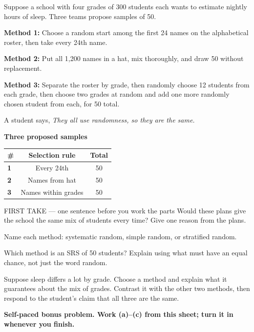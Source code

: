 \documentclass[14pt]{extarticle}
\begin{document}
\pagestyle{empty}


\noindent\begin{minipage}[t]{0.57\linewidth}
\vspace{0pt}
Suppose a school with four grades of 300 students each wants to estimate nightly hours of sleep. Three teams propose samples of 50.\par\smallskip \textbf{Method 1:} Choose a random start among the first 24 names on the alphabetical roster, then take every 24th name.\par \textbf{Method 2:} Put all 1{,}200 names in a hat, mix thoroughly, and draw 50 without replacement.\par \textbf{Method 3:} Separate the roster by grade, then randomly choose 12 students from each grade, then choose two grades at random and add one more randomly chosen student from each, for 50 total.\par\smallskip A student says, \emph{They all use randomness, so they are the same.}\par
\end{minipage}\hfill
\begin{minipage}[t]{0.40\linewidth}
\vspace{0pt}
\begin{center}
\textbf{Three proposed samples}\par\smallskip
\begin{tabular}{|l|c|c|}
\hline
\textbf{\#} & \textbf{Selection rule} & \textbf{Total} \\ \hline
\textbf{1} & Every 24th & 50 \\ \hline
\textbf{2} & Names from hat & 50 \\ \hline
\textbf{3} & Names within grades & 50 \\ \hline
\end{tabular}
\end{center}
\end{minipage}

\begin{firsttakebox}{FIRST TAKE --- one sentence before you work the parts}
Would these plans give the school the same mix of students every time? Give one reason from the plans.
\end{firsttakebox}

\begin{description}[leftmargin=1.15in, labelwidth=1in, itemsep=2pt, topsep=2pt]
  \item[\dokbadge{1}~(a)] Name each method: systematic random, simple random, or stratified random.
  \item[\dokbadge{2}~(b)] Which method is an SRS of 50 students? Explain using what must have an equal chance, not just the word random.
  \item[\dokbadge{3}~(c)] Suppose sleep differs a lot by grade. Choose a method and explain what it guarantees about the mix of grades. Contrast it with the other two methods, then respond to the student's claim that all three are the same.
\end{description}

\vfill
\textbf{Self-paced bonus problem. Work (a)--(c) from this sheet; turn it in whenever you finish.}
\end{document}
